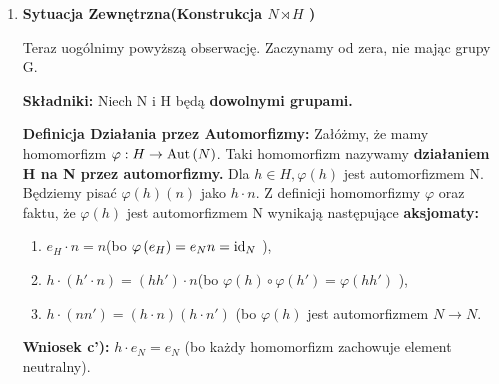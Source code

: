 \begin{goall}
\begin{enumerate}[label=\arabic*.]
\begin{figure}[H]
	\end{figure}

\vspace{3.5em}

\noindent\textbf{Wniosek(intuicja): } Ten rachunek pokazuje, że mnożenie w NH jest całkowicie zdeterminowane przez trzy operacje:
	\begin{enumerate}[label=\alph*)]
		\item Działanie w N(mnożenie $n_1 \text{ przez } \left( h_1\cdot n_2 \right) $,
		\item Działanie w H(mnożenie $h_1\text{ przez } h_2$),
		\item Działanie H na N(obliczenie $h_1\cdot n_2$ ).
	\end{enumerate}
\item \textbf{Sytuacja Zewnętrzna(Konstrukcja $N\rtimes H$ )}

	Teraz uogólnimy powyższą obserwację. Zaczynamy od zera, nie mając grupy G.

	\noindent\textbf{Składniki: } Niech N i H będą \textbf{dowolnymi grupami.}

	\noindent\textbf{Definicja Działania przez Automorfizmy: } Załóżmy, że mamy homomorfizm $\varphi: H \rightarrow \operatorname{Aut}\left(N\right) $.
	Taki homomorfizm nazywamy \textbf{działaniem H na N przez automorfizmy.} Dla $h \in H, \varphi\left( h \right) $ jest automorfizmem N. Będziemy pisać $\varphi\left( h \right) \left( n \right) $ jako $h\cdot n$. Z definicji homomorfizmy $\varphi$ oraz faktu, że $\varphi\left( h \right) $ jest automorfizmem N wynikają następujące  \textbf{aksjomaty:}
	\begin{enumerate}[label=\alph*)]
		\item $e_{H} \cdot n = n$(bo $\varphi\left( e_{H} \right) = e_{N}n = \operatorname{id}_{N}$ ),
		\item $h\cdot \left( h' \cdot n \right) = \left( hh' \right) \cdot n$(bo $\varphi\left( h \right) \circ \varphi\left( h' \right) = \varphi\left( hh' \right) $ ),
		\item $h\cdot \left( nn' \right) = \left( h\cdot n \right) \left( h\cdot n' \right)$ (bo $\varphi\left( h \right)$ jest automorfizmem $N\rightarrow N$.
	\end{enumerate}
\textbf{Wniosek c'):} $h\cdot e_{N} = e_{N}$ (bo każdy homomorfizm zachowuje element neutralny). 


\end{enumerate}
\end{goall}
